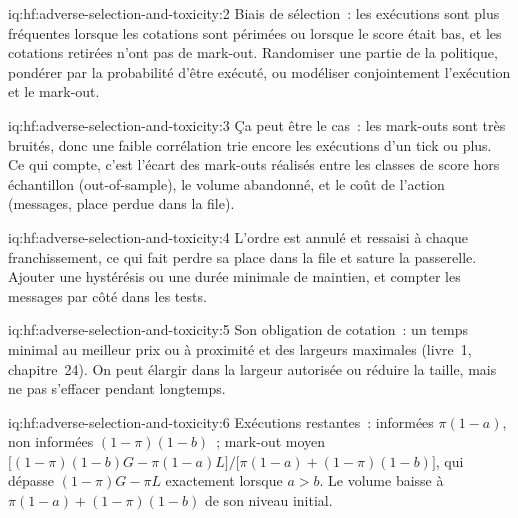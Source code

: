 \begin{solution}{iq:hf:adverse-selection-and-toxicity:2}
Biais de sélection~: les exécutions sont plus fréquentes lorsque les cotations sont périmées ou lorsque le score était bas, et les cotations retirées n'ont pas de mark-out. Randomiser une partie de la
politique, pondérer par la probabilité d'être exécuté, ou modéliser conjointement l'exécution et le mark-out.
\end{solution}

\begin{solution}{iq:hf:adverse-selection-and-toxicity:3}
Ça peut être le cas~: les mark-outs sont très bruités, donc une faible corrélation trie encore les exécutions d'un tick ou plus. Ce qui compte, c'est l'écart des mark-outs réalisés
entre les classes de score hors échantillon (out-of-sample), le volume abandonné, et le coût de l'action (messages, place perdue dans la file).
\end{solution}

\begin{solution}{iq:hf:adverse-selection-and-toxicity:4}
L'ordre est annulé et ressaisi à chaque franchissement, ce qui fait perdre sa place dans la file et sature la passerelle. Ajouter une hystérésis ou une durée minimale de maintien, et
compter les messages par côté dans les tests.
\end{solution}

\begin{solution}{iq:hf:adverse-selection-and-toxicity:5}
Son obligation de cotation~: un temps minimal au meilleur prix ou à proximité et des largeurs maximales (livre~1, chapitre~24). On peut élargir dans la
largeur autorisée ou réduire la taille, mais ne pas s'effacer pendant longtemps.
\end{solution}

\begin{solution}{iq:hf:adverse-selection-and-toxicity:6}
Exécutions restantes~: informées $\pi(1-a)$, non informées $(1-\pi)(1-b)$~; mark-out moyen $\bigl[(1-\pi)(1-b)G-\pi(1-a)L\bigr]/\bigl[\pi(1-a)+(1-\pi)(1-b)\bigr]$,
qui dépasse $(1-\pi)G-\pi L$ exactement lorsque $a>b$. Le volume baisse à $\pi(1-a)+(1-\pi)(1-b)$ de son niveau initial.
\end{solution}
